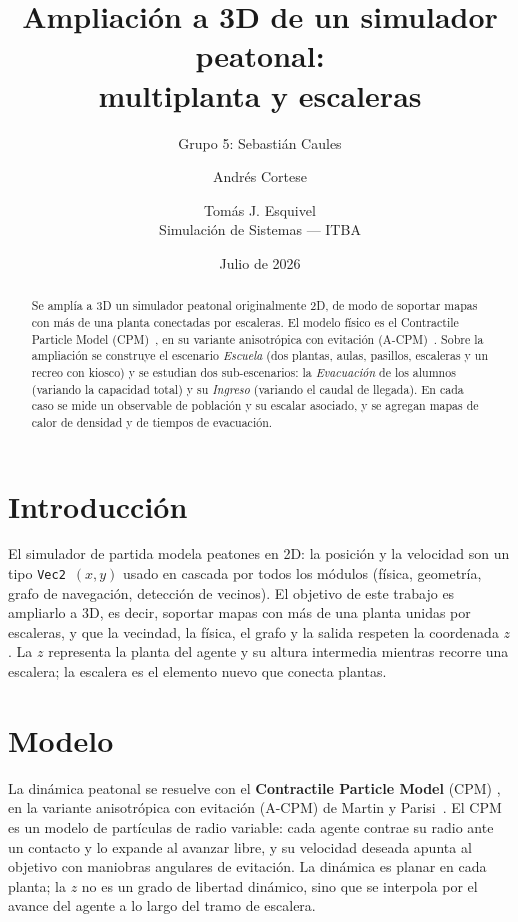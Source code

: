\documentclass[11pt,a4paper]{article}
\title{\vspace{-1.2cm}\textbf{Ampliación a 3D de un simulador peatonal:\\ multiplanta y escaleras}}
\author{Grupo 5: Sebastián Caules \and Andrés Cortese \and Tomás J. Esquivel\\[2pt]
\normalsize Simulación de Sistemas --- ITBA}
\date{Julio de 2026}
\begin{document}
\maketitle
\vspace{-0.4cm}

\begin{abstract}
\noindent
Se amplía a 3D un simulador peatonal originalmente 2D, de modo de soportar mapas con
más de una planta conectadas por escaleras. El modelo físico es el Contractile Particle
Model (CPM)~\cite{baglietto2011}, en su variante anisotrópica con evitación
(A-CPM)~\cite{martin2024}. Sobre la ampliación se construye el escenario \emph{Escuela}
(dos plantas, aulas, pasillos, escaleras y un recreo con kiosco) y se estudian dos
sub-escenarios: la \emph{Evacuación} de los alumnos (variando la capacidad total) y su
\emph{Ingreso} (variando el caudal de llegada). En cada caso se mide un observable de
población y su escalar asociado, y se agregan mapas de calor de densidad y de tiempos de
evacuación.
\end{abstract}

\section{Introducción}
\label{sec:intro}

El simulador de partida modela peatones en 2D: la posición y la velocidad son un tipo
\texttt{Vec2}~$(x,y)$ usado en cascada por todos los módulos (física, geometría, grafo de
navegación, detección de vecinos). El objetivo de este trabajo es ampliarlo a 3D, es decir,
soportar mapas con más de una planta unidas por escaleras, y que la vecindad, la física, el
grafo y la salida respeten la coordenada $z$. La $z$ representa la planta del agente y su
altura intermedia mientras recorre una escalera; la escalera es el elemento nuevo que conecta
plantas.

\section{Modelo}
\label{sec:modelo}

La dinámica peatonal se resuelve con el \textbf{Contractile Particle Model} (CPM)
\cite{baglietto2011}, en la variante anisotrópica con evitación (A-CPM) de Martin y
Parisi~\cite{martin2024}. El CPM es un modelo de partículas de radio variable: cada agente
contrae su radio ante un contacto y lo expande al avanzar libre, y su velocidad deseada
apunta al objetivo con maniobras angulares de evitación. La dinámica es planar en cada planta;
la $z$ no es un grado de libertad dinámico, sino que se interpola por el avance del agente a
lo largo del tramo de escalera.
\end{document}
